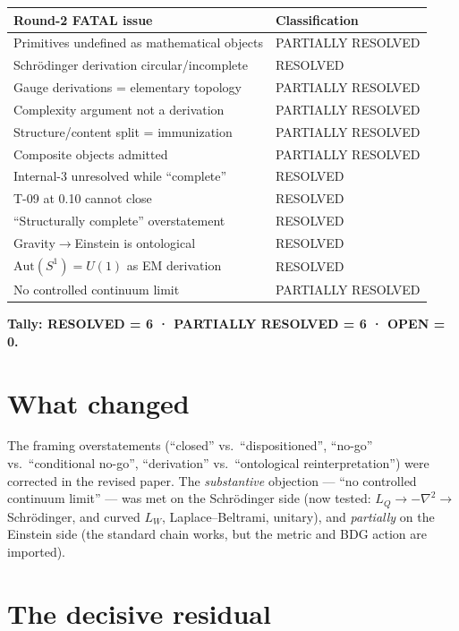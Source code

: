 \documentclass[10pt,twoside,openany]{book}
\begin{document}
\begin{center}
\begin{tabular}{p{6.5cm}l}
\toprule
Round-2 FATAL issue & Classification \\
\midrule
Primitives undefined as mathematical objects & PARTIALLY RESOLVED \\
Schr\"odinger derivation circular/incomplete & RESOLVED \\
Gauge derivations = elementary topology & PARTIALLY RESOLVED \\
Complexity argument not a derivation & PARTIALLY RESOLVED \\
Structure/content split = immunization & PARTIALLY RESOLVED \\
Composite objects admitted & PARTIALLY RESOLVED \\
Internal-3 unresolved while ``complete'' & RESOLVED \\
T-09 at 0.10 cannot close & RESOLVED \\
``Structurally complete'' overstatement & RESOLVED \\
Gravity$\to$Einstein is ontological & RESOLVED \\
$\mathrm{Aut}(S^1)=U(1)$ as EM derivation & RESOLVED \\
No controlled continuum limit & PARTIALLY RESOLVED \\
\bottomrule
\end{tabular}
\end{center}

\textbf{Tally: RESOLVED = 6 · PARTIALLY RESOLVED = 6 · OPEN = 0.}

\section{What changed}

The framing overstatements (``closed'' vs.\ ``dispositioned'', ``no-go'' vs.\
``conditional no-go'', ``derivation'' vs.\ ``ontological reinterpretation'') were
corrected in the revised paper. The \emph{substantive} objection — ``no controlled
continuum limit'' — was met on the Schr\"odinger side (now tested: $L_Q\to-\nabla^2\to$
Schr\"odinger, and curved $L_W$, Laplace--Beltrami, unitary), and \emph{partially} on the
Einstein side (the standard chain works, but the metric and BDG action are imported).

\section{The decisive residual}
\end{document}
